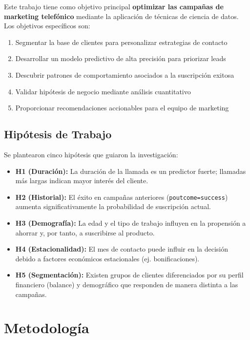 \documentclass[12pt,letterpaper]{article}
\begin{document}
Este trabajo tiene como objetivo principal \textbf{optimizar las campañas de marketing telefónico} mediante la aplicación de técnicas de ciencia de datos. Los objetivos específicos son:

\begin{enumerate}
    \item Segmentar la base de clientes para personalizar estrategias de contacto
    \item Desarrollar un modelo predictivo de alta precisión para priorizar leads
    \item Descubrir patrones de comportamiento asociados a la suscripción exitosa
    \item Validar hipótesis de negocio mediante análisis cuantitativo
    \item Proporcionar recomendaciones accionables para el equipo de marketing
\end{enumerate}

\subsection{Hipótesis de Trabajo}

Se plantearon cinco hipótesis que guiaron la investigación:

\begin{itemize}
    \item \textbf{H1 (Duración):} La duración de la llamada es un predictor fuerte; llamadas más largas indican mayor interés del cliente.
    \item \textbf{H2 (Historial):} El éxito en campañas anteriores (\texttt{poutcome=success}) aumenta significativamente la probabilidad de suscripción actual.
    \item \textbf{H3 (Demografía):} La edad y el tipo de trabajo influyen en la propensión a ahorrar y, por tanto, a suscribirse al producto.
    \item \textbf{H4 (Estacionalidad):} El mes de contacto puede influir en la decisión debido a factores económicos estacionales (ej. bonificaciones).
    \item \textbf{H5 (Segmentación):} Existen grupos de clientes diferenciados por su perfil financiero (balance) y demográfico que responden de manera distinta a las campañas.
\end{itemize}

\section{Metodología}
\end{document}
